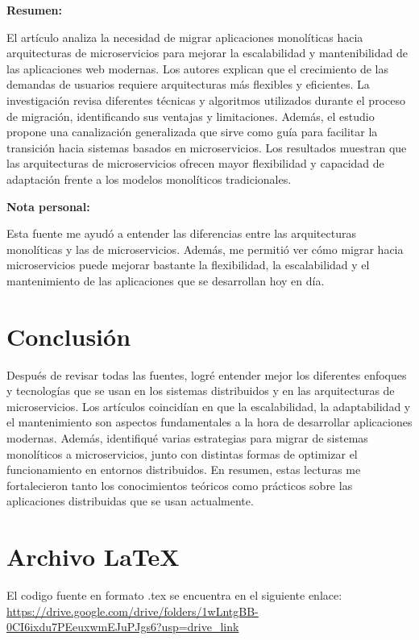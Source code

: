 \documentclass[12pt]{article}
\begin{document}
\textbf{Resumen:}

El artículo analiza la necesidad de migrar aplicaciones monolíticas hacia arquitecturas de microservicios para mejorar la escalabilidad y mantenibilidad de las aplicaciones web modernas. Los autores explican que el crecimiento de las demandas de usuarios requiere arquitecturas más flexibles y eficientes. La investigación revisa diferentes técnicas y algoritmos utilizados durante el proceso de migración, identificando sus ventajas y limitaciones. Además, el estudio propone una canalización generalizada que sirve como guía para facilitar la transición hacia sistemas basados en microservicios. Los resultados muestran que las arquitecturas de microservicios ofrecen mayor flexibilidad y capacidad de adaptación frente a los modelos monolíticos tradicionales.

\vspace{0.3cm}

\textbf{Nota personal:}

Esta fuente me ayudó a entender las diferencias entre las arquitecturas monolíticas y las de microservicios. Además, me permitió ver cómo migrar hacia microservicios puede mejorar bastante la flexibilidad, la escalabilidad y el mantenimiento de las aplicaciones que se desarrollan hoy en día.

\newpage

\section{Conclusión}

Después de revisar todas las fuentes, logré entender mejor los diferentes enfoques y tecnologías que se usan en los sistemas distribuidos y en las arquitecturas de microservicios. Los artículos coincidían en que la escalabilidad, la adaptabilidad y el mantenimiento son aspectos fundamentales a la hora de desarrollar aplicaciones modernas.
Además, identifiqué varias estrategias para migrar de sistemas monolíticos a microservicios, junto con distintas formas de optimizar el funcionamiento en entornos distribuidos. En resumen, estas lecturas me fortalecieron tanto los conocimientos teóricos como prácticos sobre las aplicaciones distribuidas que se usan actualmente.

\newpage

\section{Archivo LaTeX}

El codigo fuente en formato .tex se encuentra en el siguiente enlace:
\url{https://drive.google.com/drive/folders/1wLntgBB-0CI6ixdu7PEeuxwmEJuPJgs6?usp=drive_link}
\end{document}

